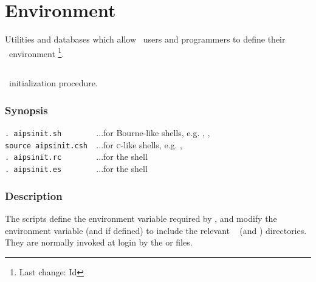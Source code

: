 \chapter{Environment}
\label{Environment}

Utilities and databases which allow \aipspp\ users and programmers to
define their \aipspp\ environment \footnote{Last change:
$ $Id$ $}.


\section{}
\label{aipsinit}
\label{aipsinit.csh}
\label{aipsinit.sh}



\aipspp\ initialization procedure.

\subsection*{Synopsis}

\begin{synopsis}
   \verb+. aipsinit.sh        +...for Bourne-like shells, e.g. ,
                                  ,  \\
   \verb+source aipsinit.csh  +...for \textsc{c}-like shells, e.g.
                                  ,  \\
   \verb+. aipsinit.rc        +...for the  shell \\
   \verb+. aipsinit.es        +...for the  shell
\end{synopsis}

\subsection*{Description}

The  scripts define the  environment variable
required by \aipspp, and modify the  environment variable (and
 if defined) to include the relevant \aipspp\  (and
) directories.  They are normally invoked at login by the
 or  files.


